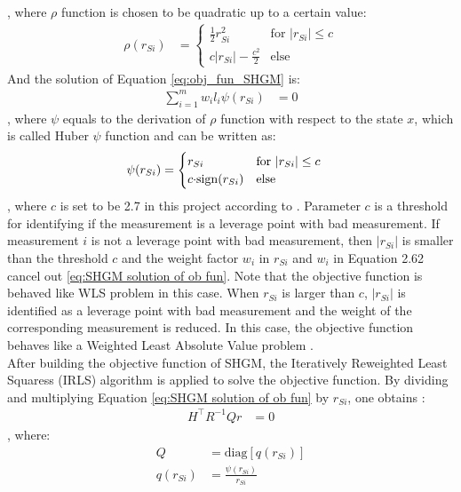 , where $\rho$ function is chosen to be quadratic up to a certain value:
\begin{align}
    \rho(r_{Si}) &= \begin{cases}
       \frac{1}{2} r_{Si}^{2} & \text{for } |r_{Si}| \leq c  \\
        c|r_{Si}|-\frac{c^2}{2} &  \text{else} 
    \end{cases}
    \label{eq:SHGM p function}
\end{align}
And the solution of Equation \ref{eq:obj_fun_SHGM} is:
\begin{align}
    \sum_{i=1}^{m} w_i l_i \psi(r_{Si}) &= 0
    \label{eq:SHGM solution of ob fun}
\end{align}
, where $\psi$ equals to the derivation of $\rho$ function with respect to the state $x$, which is called Huber $\psi$ function and can be written as:
\begin{align}
    \psi(r_{Si}) &= \begin{cases}
        r_{Si} & \text{for } |r_{Si}| \leq c  \\
        {c \cdot} {\operatorname{sign}}(r_{Si}) &  \text{else} 
    \end{cases}
    \label{eq:SHGM psi function}
\end{align}
, where $c$ is set to be 2.7 in this project according to \cite{rousseeuw1993alternatives}. Parameter $c$ is a threshold for identifying if the measurement is a leverage point with bad measurement. If measurement $i$ is not a leverage point with bad measurement, then $|r_{Si}|$ is smaller than the threshold $c$ and the weight factor $w_i$ in $r_{Si}$ and $w_i$ in Equation 2.62 cancel out \ref{eq:SHGM solution of ob fun}. Note that the objective function is behaved like WLS problem in this case. When $r_{Si}$ is larger than $c$, $|r_{Si}|$ is identified as a leverage point with bad measurement and the weight of the corresponding measurement is reduced. In this case, the objective function behaves like a Weighted Least Absolute Value problem \cite{singh1994weighted}.  
\bigskip
\\After building the objective function of SHGM, the Iteratively Reweighted Least Squaress (IRLS) algorithm is applied to solve the objective function. By dividing and multiplying Equation \ref{eq:SHGM solution of ob fun} by $r_{Si}$, one obtains \cite{mili1996robust}:
\begin{align}
    H^{\intercal}R^{-1}Qr &= 0
    \label{eq:SHGM_IRLS}
\end{align}
, where:
\begin{align}
    Q &= \mathrm{diag}[q(r_{Si})]\\[1pt]
    \label{eq:SHGM Q}
    q(r_{Si}) &= \frac{\psi(r_{Si})}{r_{Si}}
    \label{eq:SHGM q}
\end{align}
